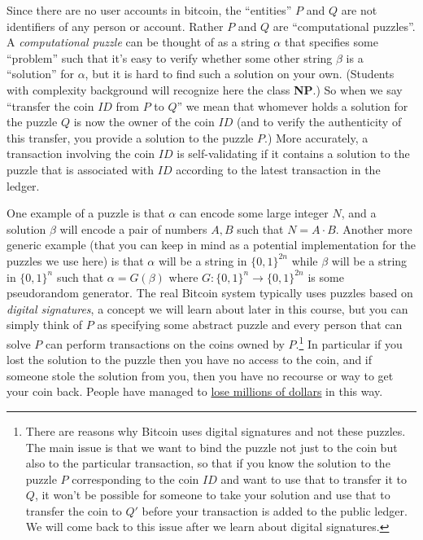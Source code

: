 Since there are no user accounts in bitcoin, the ``entities'' \(P\) and
\(Q\) are not identifiers of any person or account. Rather \(P\) and
\(Q\) are ``computational puzzles''. A \emph{computational puzzle} can
be thought of as a string \(\alpha\) that specifies some ``problem''
such that it's easy to verify whether some other string \(\beta\) is a
``solution'' for \(\alpha\), but it is hard to find such a solution on
your own. (Students with complexity background will recognize here the
class \textbf{NP}.) So when we say ``transfer the coin
\(\ensuremath{\mathit{ID}}\) from \(P\) to \(Q\)'' we mean that whomever
holds a solution for the puzzle \(Q\) is now the owner of the coin
\(\ensuremath{\mathit{ID}}\) (and to verify the authenticity of this
transfer, you provide a solution to the puzzle \(P\).) More accurately,
a transaction involving the coin \(\ensuremath{\mathit{ID}}\) is
self-validating if it contains a solution to the puzzle that is
associated with \(\ensuremath{\mathit{ID}}\) according to the latest
transaction in the ledger.


One example of a puzzle is that \(\alpha\) can encode some large integer
\(N\), and a solution \(\beta\) will encode a pair of numbers \(A,B\)
such that \(N=A\cdot B\). Another more generic example (that you can
keep in mind as a potential implementation for the puzzles we use here)
is that \(\alpha\) will be a string in \(\{0,1\}^{2n}\) while \(\beta\)
will be a string in \(\{0,1\}^n\) such that \(\alpha = G(\beta)\) where
\(G:\{0,1\}^n\rightarrow\{0,1\}^{2n}\) is some pseudorandom generator.
The real Bitcoin system typically uses puzzles based on \emph{digital
signatures}, a concept we will learn about later in this course, but you
can simply think of \(P\) as specifying some abstract puzzle and every
person that can solve \(P\) can perform transactions on the coins owned
by \(P\).\footnote{There are reasons why Bitcoin uses digital signatures
  and not these puzzles. The main issue is that we want to bind the
  puzzle not just to the coin but also to the particular transaction, so
  that if you know the solution to the puzzle \(P\) corresponding to the
  coin \(\ensuremath{\mathit{ID}}\) and want to use that to transfer it
  to \(Q\), it won't be possible for someone to take your solution and
  use that to transfer the coin to \(Q'\) before your transaction is
  added to the public ledger. We will come back to this issue after we
  learn about digital signatures.} In particular if you lost the
solution to the puzzle then you have no access to the coin, and if
someone stole the solution from you, then you have no recourse or way to
get your coin back. People have managed to
\href{http://readwrite.com/2014/01/13/what-happens-to-lost-bitcoins}{lose
millions of dollars} in this way.


